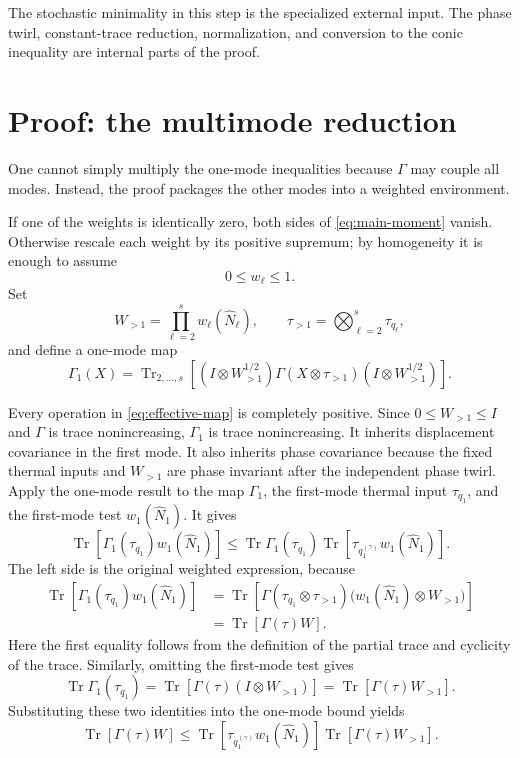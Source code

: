 \documentclass[11pt]{article}
\newcommand{\Tr}{\operatorname{Tr}}
\newcommand{\ot}{\otimes}
\begin{document}
The stochastic minimality in this step is the specialized external input.
The phase twirl, constant-trace reduction, normalization, and conversion to
the conic inequality are internal parts of the proof.

\section{Proof: the multimode reduction}

One cannot simply multiply the one-mode inequalities because $\Gamma$ may
couple all modes.  Instead, the proof packages the other modes into a
weighted environment.

If one of the weights is identically zero, both sides of
\eqref{eq:main-moment} vanish.  Otherwise rescale each weight by its positive
supremum; by homogeneity it is enough to assume
\[
  0\leq w_\ell\leq1.
\]
Set
\[
  W_{>1}=\prod_{\ell=2}^s w_\ell(\widehat N_\ell),
  \qquad
  \tau_{>1}=\bigotimes_{\ell=2}^s\tau_{q_\ell},
\]
and define a one-mode map
\begin{equation}\label{eq:effective-map}
  \Gamma_1(X)
  =\Tr_{2,\ldots,s}\!\left[
    (I\ot W_{>1}^{1/2})
    \Gamma(X\ot\tau_{>1})
    (I\ot W_{>1}^{1/2})
  \right].
\end{equation}

Every operation in \eqref{eq:effective-map} is completely positive.  Since
$0\leq W_{>1}\leq I$ and $\Gamma$ is trace nonincreasing, $\Gamma_1$ is
trace nonincreasing.  It inherits displacement covariance in the first
mode.  It also inherits phase covariance because the fixed thermal inputs
and $W_{>1}$ are phase invariant after the independent phase twirl.
Apply the one-mode result to the map $\Gamma_1$, the first-mode thermal input
$\tau_{q_1}$, and the first-mode test $w_1(\widehat N_1)$.  It gives
\[
  \Tr\!\left[\Gamma_1(\tau_{q_1})w_1(\widehat N_1)\right]
  \leq
  \Tr\Gamma_1(\tau_{q_1})
  \Tr\!\left[\tau_{q_1^{(\gamma)}}w_1(\widehat N_1)\right].
\]
The left side is the original weighted expression, because
\begin{align*}
  \Tr\!\left[\Gamma_1(\tau_{q_1})w_1(\widehat N_1)\right]
  &=\Tr\!\left[
      \Gamma(\tau_{q_1}\ot\tau_{>1})
      \bigl(w_1(\widehat N_1)\ot W_{>1}\bigr)
    \right] \\
  &=\Tr[\Gamma(\tau)W].
\end{align*}
Here the first equality follows from the definition of the partial trace and
cyclicity of the trace.  Similarly, omitting the first-mode test gives
\[
  \Tr\Gamma_1(\tau_{q_1})
  =\Tr\!\left[
    \Gamma(\tau)(I\ot W_{>1})
  \right]
  =\Tr[\Gamma(\tau)W_{>1}].
\]
Substituting these two identities into the one-mode bound yields
\begin{equation}\label{eq:peel-first}
  \Tr[\Gamma(\tau)W]
  \leq
  \Tr[\tau_{q_1^{(\gamma)}}w_1(\widehat N_1)]
  \Tr[\Gamma(\tau)W_{>1}].
\end{equation}
\end{document}
